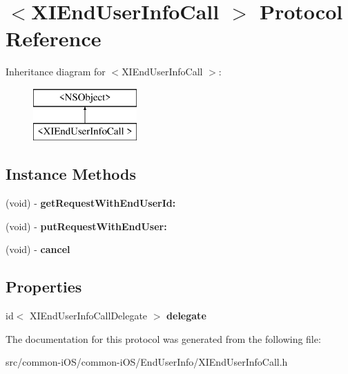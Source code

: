 \hypertarget{protocol_x_i_end_user_info_call_01-p}{}\section{$<$X\+I\+End\+User\+Info\+Call $>$ Protocol Reference}
\label{protocol_x_i_end_user_info_call_01-p}
Inheritance diagram for $<$X\+I\+End\+User\+Info\+Call $>$\+:\begin{figure}[H]
\begin{center}
\leavevmode
\includegraphics[height=2.000000cm]{protocol_x_i_end_user_info_call_01-p}
\end{center}
\end{figure}
\subsection*{Instance Methods}
\begin{DoxyCompactItemize}
\item 
\hypertarget{protocol_x_i_end_user_info_call_01-p_a6d3796eae8898bceb5cf1082a01fa0ad}{}\label{protocol_x_i_end_user_info_call_01-p_a6d3796eae8898bceb5cf1082a01fa0ad} 
(void) -\/ {\bfseries get\+Request\+With\+End\+User\+Id\+:}
\item 
\hypertarget{protocol_x_i_end_user_info_call_01-p_acd91190a4c1af0d177f3feeb2c80c8bd}{}\label{protocol_x_i_end_user_info_call_01-p_acd91190a4c1af0d177f3feeb2c80c8bd} 
(void) -\/ {\bfseries put\+Request\+With\+End\+User\+:}
\item 
\hypertarget{protocol_x_i_end_user_info_call_01-p_a4f706f8c2498e6ee8f81b033652ea4ab}{}\label{protocol_x_i_end_user_info_call_01-p_a4f706f8c2498e6ee8f81b033652ea4ab} 
(void) -\/ {\bfseries cancel}
\end{DoxyCompactItemize}
\subsection*{Properties}
\begin{DoxyCompactItemize}
\item 
\hypertarget{protocol_x_i_end_user_info_call_01-p_a81983ce8c56cebeecab48ffa97da3b3b}{}\label{protocol_x_i_end_user_info_call_01-p_a81983ce8c56cebeecab48ffa97da3b3b} 
id$<$ X\+I\+End\+User\+Info\+Call\+Delegate $>$ {\bfseries delegate}
\end{DoxyCompactItemize}


The documentation for this protocol was generated from the following file\+:\begin{DoxyCompactItemize}
\item 
src/common-\/i\+O\+S/common-\/i\+O\+S/\+End\+User\+Info/X\+I\+End\+User\+Info\+Call.\+h\end{DoxyCompactItemize}
